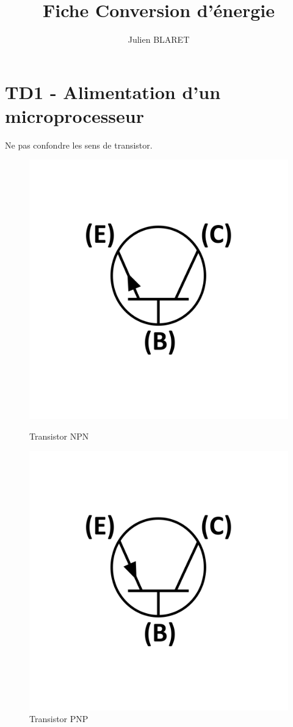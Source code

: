 \documentclass[french,10pt,a4paper]{article}
\title{Fiche Conversion d'énergie}
\author{Julien BLARET}
\begin{document}
	\maketitle
\section{TD1 - Alimentation d'un microprocesseur}
Ne pas confondre les sens de transistor. \newline
\begin{figure}[!h]
	\begin{minipage}{0.4\linewidth}
		\centering
		\includegraphics[width=0.7\linewidth]{NPN}
		\caption{Transistor NPN}
		\label{fig:npn}
	\end{minipage}
	\hfill
	\begin{minipage}{0.4\linewidth}
		\centering
		\includegraphics[width=0.7\linewidth]{PNP}
		\caption{Transistor PNP}
		\label{fig:pnp}
	\end{minipage}
\end{figure}
\end{document}
